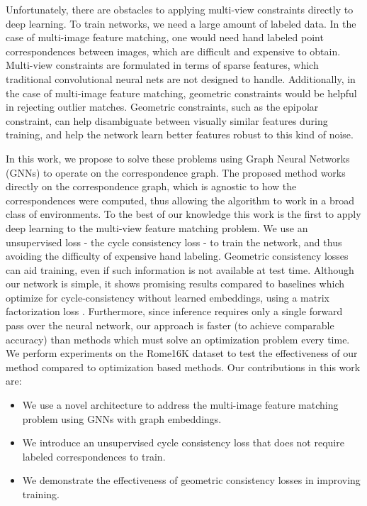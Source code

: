 \documentclass{article} %
\begin{document}
Unfortunately, there are obstacles to applying multi-view constraints directly to deep learning. 
To train networks, we need a large amount of labeled data.
In the case of multi-image feature matching, one would need hand labeled point correspondences between images, which are difficult and expensive to obtain.
Multi-view constraints are formulated in terms of sparse features, which traditional convolutional neural nets are not designed to handle.
Additionally, in the case of multi-image feature matching, geometric constraints would be helpful in rejecting outlier matches.
Geometric constraints, such as the epipolar constraint, can help disambiguate between visually similar features during training, and help the network learn better features robust to this kind of noise.

In this work, we propose to solve these problems using Graph Neural Networks (GNNs) to operate on the correspondence graph.
The proposed method works directly on the correspondence graph, which is agnostic to how the correspondences were computed, thus allowing the algorithm to work in a broad class of environments.
To the best of our knowledge this work is the first to apply deep learning to the multi-view feature matching problem.
We use an unsupervised loss - the cycle consistency loss - to train the network, and thus avoiding the difficulty of expensive hand labeling.
Geometric consistency losses can aid training, even if such information is not available at test time.
Although our network is simple, it shows promising results compared to baselines which optimize for cycle-consistency without learned embeddings, using a matrix factorization loss \cite{zhou2015multi, leonardos2016distributed}.
Furthermore, since inference requires only a single forward pass over the neural network, our approach is faster (to achieve comparable accuracy) than methods which must solve an optimization problem every time.
We perform experiments on the Rome16K \cite{li2010location} dataset to test the effectiveness of our method compared to optimization based methods.
Our contributions in this work are:
\begin{itemize}
\item We use a novel architecture to address the multi-image feature matching problem using GNNs with graph embeddings.
\item We introduce an unsupervised cycle consistency loss that does not require labeled correspondences to train.
\item We demonstrate the effectiveness of geometric consistency losses in improving training.
\end{itemize}
\end{document}
